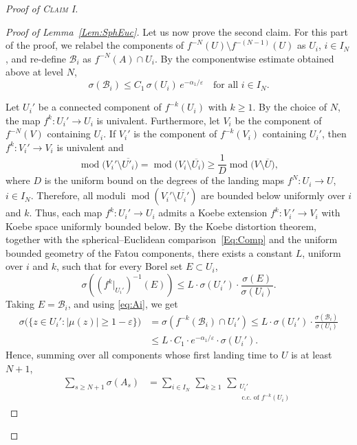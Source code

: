 \documentclass[11pt,a4paper, oneside]{amsart}
\theoremstyle{definition}
\theoremstyle{remark}
\numberwithin{equation}{section}
\newcommand{\Mod}{\operatorname{mod}}
\renewcommand{\ge}{\geqslant}
\renewcommand{\le}{\leqslant}
\newcommand{\eps}{\varepsilon}
\newcommand{\ovl}{\overline}
\newcommand{\sm}{\setminus}
\begin{document}
\begin{proof}[Proof of \textsc{Claim I}]
\begin{proof}[Proof of Lemma~\ref{Lem:SphEuc}]
Let us now prove the second claim. {For this part of the proof, we relabel the components of 
	$f^{-N}(U)\setminus f^{-(N-1)}(U)$ as $U_i$, $i\in I_N$, and re-define $\mathcal{B}_i$
	as $f^{-N}(A)\cap U_i$. By the componentwise estimate obtained above at level $N$,}
\begin{equation}\label{eq:Ai}
{\sigma(\mathcal{B}_i)\le C_1\,\sigma(U_i)\,e^{-\alpha_1/\eps}
	\quad\text{for all }i\in I_N.}
\end{equation}



Let $U_i'$ be a connected component of $f^{-k}(U_i)$ with $k\ge1$. 
{By the choice of $N$, the map} $f^k \colon U_i' \to U_i$ is univalent. 
Furthermore, {let $V_i$ be the component of $f^{-N}(V)$ containing $U_i$.} If $V_i'$ is the component of $f^{-k}(V_i)$ containing $U_i'$, then $f^k \colon V_i' \to V_i$ is univalent and 
\[
\Mod\big(V_i'\sm\ovl{U'_i}\big) = \Mod\big(V_i\sm\ovl{U_i}\big) \ge \frac{1}{D}\Mod\big(V \sm \ovl{U}\big),
\]
where $D$ is the uniform bound on the degrees of the landing maps $f^N \colon U_i \to U$, $i\in I_N$. Therefore, all moduli $\Mod(V_i' \sm \ovl{U_i'})$ are bounded below uniformly over $i$ and $k$. Thus, each map $f^k \colon U_i' \to U_i$ admits a Koebe extension $f^k \colon V_i' \to V_i$ with Koebe space uniformly bounded below.  By the Koebe distortion theorem, together with the spherical--Euclidean comparison~\eqref{Eq:Comp} {and the uniform bounded geometry of the Fatou components,} there exists a constant $L$, uniform over $i$ and $k$, such that for every Borel set $E\subset U_i$,
\[
{
	\sigma\left((f^k|_{U_i'})^{-1}(E)\right)
	\le L\cdot \sigma(U_i')\cdot \frac{\sigma(E)}{\sigma(U_i)}.}
\]
{Taking $E=\mathcal{B}_i$, and using \eqref{eq:Ai}, we get}
\begin{equation*}
		\begin{aligned}
			\sigma\big(\{z \in U_i' : |\mu(z)|\ge 1-\eps\}\big)
			&= \sigma\left(f^{-k}(\mathcal{B}_i) \cap U_i'\right)	{
			\le L\cdot \sigma(U_i')\cdot \frac{\sigma(\mathcal{B}_i)}{\sigma(U_i)}}\\
			&\le {L\cdot C_1\cdot e^{-\alpha_1/\eps}\cdot \sigma(U_i').}
	\end{aligned}
\end{equation*}
Hence, {summing over all components whose first landing time to $U$ is at least $N+1$,}
\begin{equation*}
	{
		\begin{aligned}
			\sum_{s \ge N+1} \sigma(A_s)
			&= \sum_{i\in I_N} \, \sum_{k \ge 1} \, 
			\sum_{\substack{U_i'\\ \text{ c.c. of }f^{-k}(U_i)}}

\end{aligned}}
\end{equation*}
\end{proof}
\end{proof}
\end{document}
